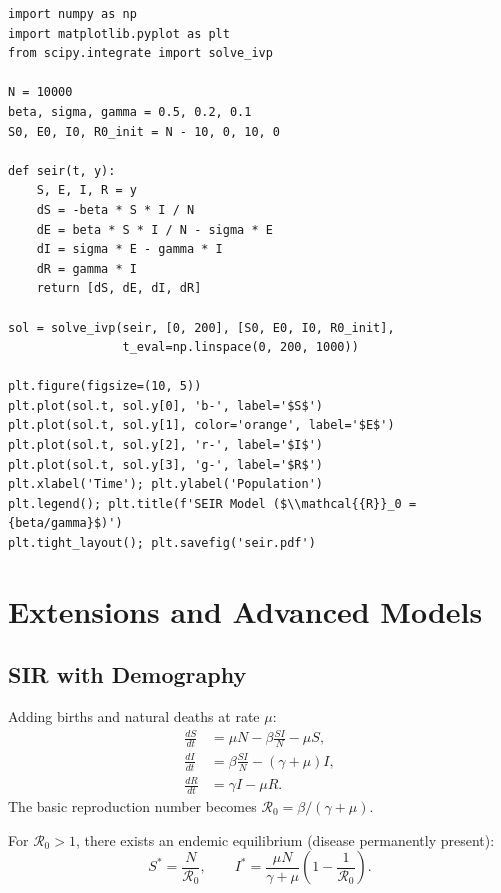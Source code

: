 \begin{codeblock}[title=\textbf{SEIR model simulation}]
\begin{verbatim}
import numpy as np
import matplotlib.pyplot as plt
from scipy.integrate import solve_ivp

N = 10000
beta, sigma, gamma = 0.5, 0.2, 0.1
S0, E0, I0, R0_init = N - 10, 0, 10, 0

def seir(t, y):
    S, E, I, R = y
    dS = -beta * S * I / N
    dE = beta * S * I / N - sigma * E
    dI = sigma * E - gamma * I
    dR = gamma * I
    return [dS, dE, dI, dR]

sol = solve_ivp(seir, [0, 200], [S0, E0, I0, R0_init],
                t_eval=np.linspace(0, 200, 1000))

plt.figure(figsize=(10, 5))
plt.plot(sol.t, sol.y[0], 'b-', label='$S$')
plt.plot(sol.t, sol.y[1], color='orange', label='$E$')
plt.plot(sol.t, sol.y[2], 'r-', label='$I$')
plt.plot(sol.t, sol.y[3], 'g-', label='$R$')
plt.xlabel('Time'); plt.ylabel('Population')
plt.legend(); plt.title(f'SEIR Model ($\\mathcal{{R}}_0 = {beta/gamma}$)')
plt.tight_layout(); plt.savefig('seir.pdf')
\end{verbatim}
\end{codeblock}

\section{Extensions and Advanced Models}

\subsection{SIR with Demography}

\begin{definition}
Adding births and natural deaths at rate $\mu$:
\begin{align}
  \frac{dS}{dt} &= \mu N - \beta\frac{SI}{N} - \mu S, \\
  \frac{dI}{dt} &= \beta\frac{SI}{N} - (\gamma+\mu) I, \\
  \frac{dR}{dt} &= \gamma I - \mu R.
\end{align}
The basic reproduction number becomes
$\mathcal{R}_0 = \beta/(\gamma+\mu)$.
\end{definition}

\begin{proposition}
For $\mathcal{R}_0 > 1$, there exists an endemic equilibrium
(disease permanently present):
\[
  S^* = \frac{N}{\mathcal{R}_0}, \qquad
  I^* = \frac{\mu N}{\gamma+\mu}\left(1-\frac{1}{\mathcal{R}_0}\right).
\]
\end{proposition}


